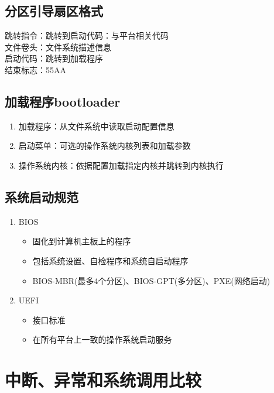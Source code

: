 \subsection{分区引导扇区格式}
跳转指令：跳转到启动代码：与平台相关代码\\
文件卷头：文件系统描述信息\\
启动代码：跳转到加载程序\\
结束标志：55AA
\subsection{加载程序bootloader}
\begin{enumerate}
	\item 加载程序：从文件系统中读取启动配置信息
	\item 启动菜单：可选的操作系统内核列表和加载参数
	\item 操作系统内核：依据配置加载指定内核并跳转到内核执行
\end{enumerate}
\subsection{系统启动规范}
\begin{enumerate}
	\item BIOS
	\begin{itemize}
		\item 固化到计算机主板上的程序
		\item 包括系统设置、自检程序和系统自启动程序
		\item BIOS-MBR(最多4个分区)、BIOS-GPT(多分区)、PXE(网络启动)
	\end{itemize}
\item UEFI
\begin{itemize}
	\item 接口标准
	\item 在所有平台上一致的操作系统启动服务
\end{itemize}
\end{enumerate}

\section{中断、异常和系统调用比较}
